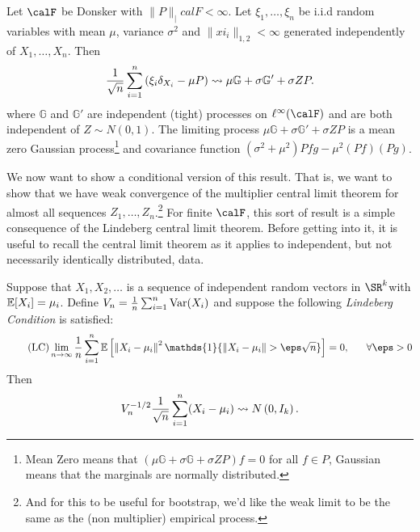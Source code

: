 \begin{corollary}
    \label{corr:unconditional-multiplier-clt}
	Let \(\calF\) be Donsker with \(\|P\|_|calF <\infty\). Let \(\xi_1,\dots,\xi_n\) be i.i.d random variables with mean \(\mu\), variance \(\sigma^2\) and \(\|xi_i\|_{1,2} <\infty\) generated independently of \(X_1,\dots,X_n\). Then
	\[
		\frac{1}{\sqrt{n}}\sum_{i=1}^n \left(\xi_i\delta_{X_i}-\mu P\right)\rightsquigarrow \mu\mathbb{G}+\sigma\mathbb{G}' +\sigma Z P
	.\] 
	where \(\mathbb{G}\) and \(\mathbb{G}'\) are independent (tight) processes on \(\ell^\infty(\calF)\) and are both independent of \(Z\sim N(0,1)\). The limiting process \(\mu\mathbb{G}+\sigma\mathbb{G}'+\sigma ZP\) is a mean zero Gaussian process\footnote{Mean Zero means that \((\mu\mathbb{G}+\sigma\mathbb{G}+\sigma ZP)f = 0\) for all \(f\in P\), Gaussian means that the marginals are normally distributed.} and covariance function \((\sigma^2+\mu^2)Pfg-\mu^2(Pf)(Pg)\).
\end{corollary}
We now want to show a conditional version of this result. That is, we want to show that we have weak convergence of the multiplier central limit theorem for almost all sequences \(Z_1,\dots,Z_n\).\footnote{And for this to be useful for bootstrap, we'd like the weak limit to be the same as the (non multiplier) empirical process.} For finite \(\calF\), this sort of result is a simple consequence of the Lindeberg central limit theorem. Before getting into it, it is useful to recall the central limit theorem as it applies to independent, but not necessarily identically distributed, data.

\begin{theorem}
	\label{thm:lindeberg-clt}
	Suppose that \(X_1,X_2,\dots\) is a sequence of independent random vectors in \(\SR^k\)with \(\mathbb{E}[X_i] = \mu_i\). Define \(V_n = \frac{1}{n}\sum_{i=1}^n \operatorname{Var}(X_i)\) and suppose the following \emph{Lindeberg Condition} is satisfied:
	\begin{equation}
		\label{eq:lindeberg-condition}
		\tag{LC}
		\lim_{n\to\infty} \frac{1}{n}\sum_{i=1}^n \E\left[\left\|X_i-\mu_i\right\|^2\mathds{1}\{\|X_i-\mu_i\|>\eps \sqrt{n}\}\right] = 0,\;\;\;\;\;\;\forall \eps >0
	\end{equation}
	Then 
	\[
		V_n^{-1/2}\frac{1}{\sqrt{n}}\sum_{i=1}^n (X_i-\mu_i) \rightsquigarrow N\left(0,I_k\right)
	.\] 
\end{theorem}

